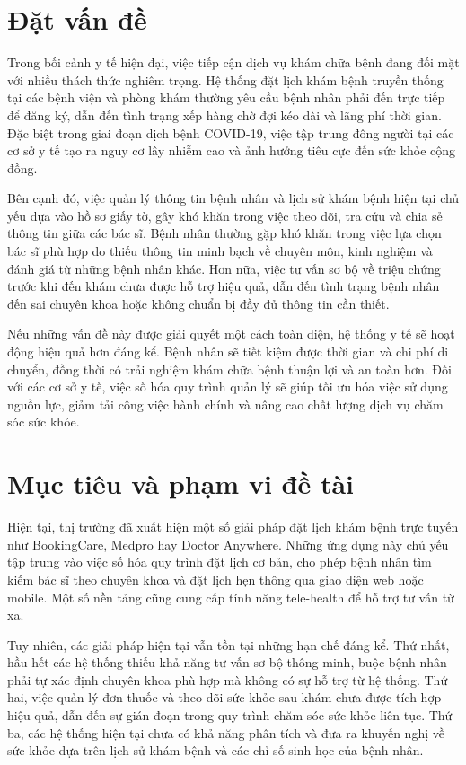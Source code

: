 \documentclass[../DoAn.tex]{subfiles}
\begin{document}
\section{Đặt vấn đề}
\label{section:1.1}

Trong bối cảnh y tế hiện đại, việc tiếp cận dịch vụ khám chữa bệnh đang đối mặt với nhiều thách thức nghiêm trọng. Hệ thống đặt lịch khám bệnh truyền thống tại các bệnh viện và phòng khám thường yêu cầu bệnh nhân phải đến trực tiếp để đăng ký, dẫn đến tình trạng xếp hàng chờ đợi kéo dài và lãng phí thời gian. Đặc biệt trong giai đoạn dịch bệnh COVID-19, việc tập trung đông người tại các cơ sở y tế tạo ra nguy cơ lây nhiễm cao và ảnh hưởng tiêu cực đến sức khỏe cộng đồng.

Bên cạnh đó, việc quản lý thông tin bệnh nhân và lịch sử khám bệnh hiện tại chủ yếu dựa vào hồ sơ giấy tờ, gây khó khăn trong việc theo dõi, tra cứu và chia sẻ thông tin giữa các bác sĩ. Bệnh nhân thường gặp khó khăn trong việc lựa chọn bác sĩ phù hợp do thiếu thông tin minh bạch về chuyên môn, kinh nghiệm và đánh giá từ những bệnh nhân khác. Hơn nữa, việc tư vấn sơ bộ về triệu chứng trước khi đến khám chưa được hỗ trợ hiệu quả, dẫn đến tình trạng bệnh nhân đến sai chuyên khoa hoặc không chuẩn bị đầy đủ thông tin cần thiết.

Nếu những vấn đề này được giải quyết một cách toàn diện, hệ thống y tế sẽ hoạt động hiệu quả hơn đáng kể. Bệnh nhân sẽ tiết kiệm được thời gian và chi phí di chuyển, đồng thời có trải nghiệm khám chữa bệnh thuận lợi và an toàn hơn. Đối với các cơ sở y tế, việc số hóa quy trình quản lý sẽ giúp tối ưu hóa việc sử dụng nguồn lực, giảm tải công việc hành chính và nâng cao chất lượng dịch vụ chăm sóc sức khỏe.

\section{Mục tiêu và phạm vi đề tài}
\label{section:1.2}

Hiện tại, thị trường đã xuất hiện một số giải pháp đặt lịch khám bệnh trực tuyến như BookingCare, Medpro hay Doctor Anywhere. Những ứng dụng này chủ yếu tập trung vào việc số hóa quy trình đặt lịch cơ bản, cho phép bệnh nhân tìm kiếm bác sĩ theo chuyên khoa và đặt lịch hẹn thông qua giao diện web hoặc mobile. Một số nền tảng cũng cung cấp tính năng tele-health để hỗ trợ tư vấn từ xa.

Tuy nhiên, các giải pháp hiện tại vẫn tồn tại những hạn chế đáng kể. Thứ nhất, hầu hết các hệ thống thiếu khả năng tư vấn sơ bộ thông minh, buộc bệnh nhân phải tự xác định chuyên khoa phù hợp mà không có sự hỗ trợ từ hệ thống. Thứ hai, việc quản lý đơn thuốc và theo dõi sức khỏe sau khám chưa được tích hợp hiệu quả, dẫn đến sự gián đoạn trong quy trình chăm sóc sức khỏe liên tục. Thứ ba, các hệ thống hiện tại chưa có khả năng phân tích và đưa ra khuyến nghị về sức khỏe dựa trên lịch sử khám bệnh và các chỉ số sinh học của bệnh nhân.
\end{document}
